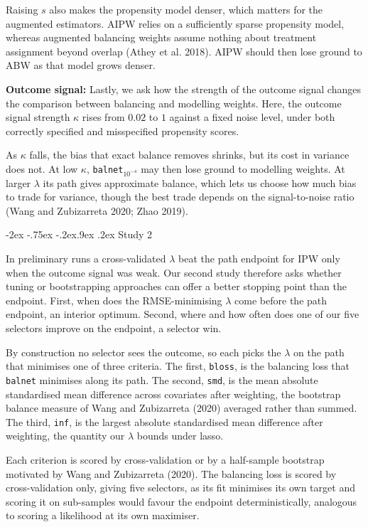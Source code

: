 \documentclass[
  12pt,
  a4paper,
]{article}
\makeatletter
\renewcommand\subsection{\@startsection{subsection}{2}{\z@}%
  {-2ex \@plus -.75ex \@minus -.2ex}{.9ex \@plus .2ex}%
  {\normalfont\large\bfseries}}
\makeatother
\begin{document}
Raising \(s\) also makes the propensity model denser, which matters for
the augmented estimators. AIPW relies on a sufficiently sparse
propensity model, whereas augmented balancing weights assume nothing
about treatment assignment beyond overlap (Athey et al. 2018). AIPW
should then lose ground to ABW as that model grows denser.

\textbf{Outcome signal:} Lastly, we ask how the strength of the outcome
signal changes the comparison between balancing and modelling weights.
Here, the outcome signal strength \(\kappa\) rises from \(0.02\) to
\(1\) against a fixed noise level, under both correctly specified and
misspecified propensity scores.

As \(\kappa\) falls, the bias that exact balance removes shrinks, but
its cost in variance does not. At low \(\kappa\),
\texttt{balnet}\(_{10^{-4}}\) may then lose ground to modelling weights.
At larger \(\lambda\) its path gives approximate balance, which lets us
choose how much bias to trade for variance, though the best trade
depends on the signal-to-noise ratio (Wang and Zubizarreta 2020; Zhao
2019).

\subsection{Study 2}\label{study-2}

In preliminary runs a cross-validated \(\lambda\) beat the path endpoint
for IPW only when the outcome signal was weak. Our second study
therefore asks whether tuning or bootstrapping approaches can offer a
better stopping point than the endpoint. First, when does the
RMSE-minimising \(\lambda\) come before the path endpoint, an interior
optimum. Second, where and how often does one of our five selectors
improve on the endpoint, a selector win.

By construction no selector sees the outcome, so each picks the
\(\lambda\) on the path that minimises one of three criteria. The first,
\texttt{bloss}, is the balancing loss that \texttt{balnet} minimises
along its path. The second, \texttt{smd}, is the mean absolute
standardised mean difference across covariates after weighting, the
bootstrap balance measure of Wang and Zubizarreta (2020) averaged rather
than summed. The third, \texttt{inf}, is the largest absolute
standardised mean difference after weighting, the quantity our
\(\lambda\) bounds under lasso.

Each criterion is scored by cross-validation or by a half-sample
bootstrap motivated by Wang and Zubizarreta (2020). The balancing loss
is scored by cross-validation only, giving five selectors, as its fit
minimises its own target and scoring it on sub-samples would favour the
endpoint deterministically, analogous to scoring a likelihood at its own
maximiser.
\end{document}
